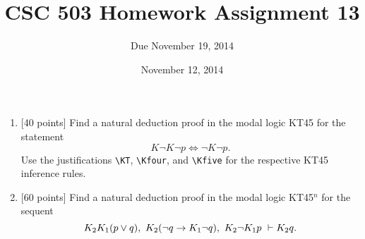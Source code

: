\documentclass{article}
\title{CSC 503 Homework Assignment 13}
\author{Due November 19, 2014}
\date{November 12, 2014}
\begin{document}
\maketitle

\begin{enumerate}

\item {[40 points]} Find a natural deduction proof in the modal logic
  KT45 for the statement
  \begin{displaymath}
    K \neg K \neg p \iff \neg K \neg p.
  \end{displaymath}
  Use the justifications \verb+\KT+, \verb+\Kfour+, and \verb+\Kfive+
  for the respective KT45 inference rules.

\item {[60 points]} Find a natural deduction proof in the modal logic
  KT45$^n$ for the sequent
  \begin{displaymath}
    K_2 K_1 (p \lor q),\ 
    K_2 (\neg q \implies K_1 \neg q),\ 
    K_2 \neg K_1 p\ 
    \turn
    K_2 q.
  \end{displaymath}

\end{enumerate}
\end{document}
